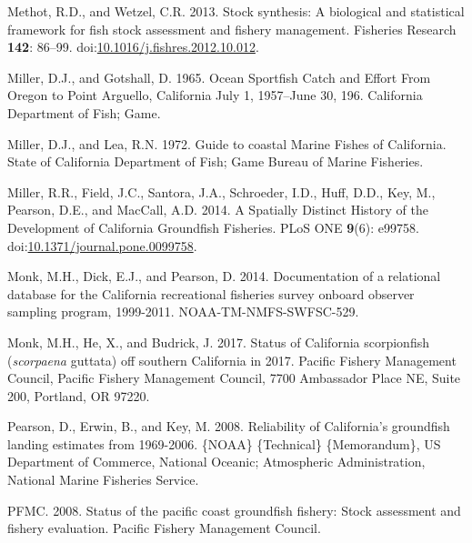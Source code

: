 \documentclass[11pt,
  english,
  letterpaper,
]{article}
\newlength{\cslhangindent}
\newenvironment{CSLReferences}[2] %
 {%
  \setlength{\parindent}{0pt}
  \ifodd #1 \everypar{\setlength{\hangindent}{\cslhangindent}}\ignorespaces\fi
  \ifnum #2 > 0
  \setlength{\parskip}{#2\baselineskip}
  \fi
 }%
 {}
\begin{document}
\begin{CSLReferences}{1}{0}
\leavevmode{}%
Methot, R.D., and Wetzel, C.R. 2013. Stock synthesis: A biological and statistical framework for fish stock assessment and fishery management. Fisheries Research \textbf{142}: 86--99. doi:\href{https://doi.org/10.1016/j.fishres.2012.10.012}{10.1016/j.fishres.2012.10.012}.

\leavevmode{}%
Miller, D.J., and Gotshall, D. 1965. Ocean {Sportfish} {Catch} and {Effort} {From} {Oregon} to {Point} {Arguello}, {California} {July} 1, 1957--{June} 30, 196. California Department of Fish; Game.

\leavevmode{}%
Miller, D.J., and Lea, R.N. 1972. Guide to coastal {Marine} {Fishes} of {California}. State of California Department of Fish; Game Bureau of Marine Fisheries.

\leavevmode{}%
Miller, R.R., Field, J.C., Santora, J.A., Schroeder, I.D., Huff, D.D., Key, M., Pearson, D.E., and MacCall, A.D. 2014. A {Spatially} {Distinct} {History} of the {Development} of {California} {Groundfish} {Fisheries}. PLoS ONE \textbf{9}(6): e99758. doi:\href{https://doi.org/10.1371/journal.pone.0099758}{10.1371/journal.pone.0099758}.

\leavevmode{}%
Monk, M.H., Dick, E.J., and Pearson, D. 2014. Documentation of a relational database for the {California} recreational fisheries survey onboard observer sampling program, 1999-2011. NOAA-TM-NMFS-SWFSC-529.

\leavevmode{}%
Monk, M.H., He, X., and Budrick, J. 2017. Status of {California} scorpionfish (\emph{scorpaena} guttata) off southern {California} in 2017. Pacific Fishery Management Council, Pacific Fishery Management Council, 7700 Ambassador Place NE, Suite 200, Portland, OR 97220.

\leavevmode{}%
Pearson, D., Erwin, B., and Key, M. 2008. Reliability of {California}'s groundfish landing estimates from 1969-2006. \{NOAA\} \{Technical\} \{Memorandum\}, US Department of Commerce, National Oceanic; Atmospheric Administration, National Marine Fisheries Service.

\leavevmode{}%
PFMC. 2008. Status of the pacific coast groundfish fishery: Stock assessment and fishery evaluation. Pacific Fishery Management Council.


\end{CSLReferences}
\end{document}

